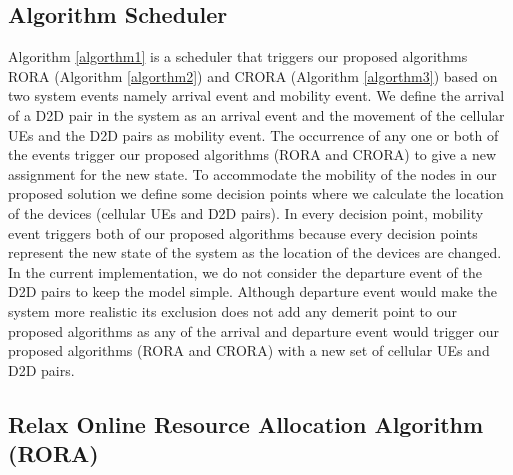 \documentclass[times]{dacauth}
\begin{document}
\smallskip


\subsection{Algorithm Scheduler}
\smallskip
\noindent
Algorithm \ref{algorthm1} is a scheduler that triggers our proposed algorithms RORA (Algorithm \ref{algorthm2}) and CRORA (Algorithm \ref{algorthm3}) based on two system events namely arrival event and mobility event. We define the arrival of a D2D pair in the system as an arrival event and the movement of the cellular UEs and the D2D pairs as mobility event. The occurrence of any one or both of the events trigger our proposed algorithms (RORA and CRORA) to give a new assignment for the new state. To accommodate the mobility of the nodes in our proposed solution we define some decision points where we calculate the location of the devices (cellular UEs and D2D pairs). In every decision point, mobility event triggers both of our proposed algorithms because every decision points represent the new state of the system as the location of the devices are changed. In the current implementation, we do not consider the departure event of the D2D pairs to keep the model simple. Although departure event would make the system more realistic its exclusion does not add any demerit point to our proposed algorithms as any of the arrival and departure event would trigger our proposed algorithms (RORA and CRORA) with a new set of cellular UEs and D2D pairs.


\subsection{Relax Online Resource Allocation Algorithm (RORA)}
\end{document}
